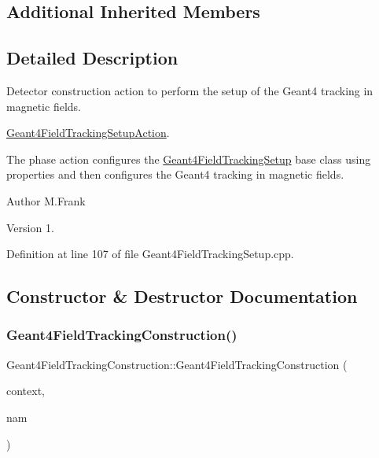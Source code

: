 \subsection*{Additional Inherited Members}


\subsection{Detailed Description}
Detector construction action to perform the setup of the Geant4 tracking in magnetic fields. 

\hyperlink{class_d_d4hep_1_1_simulation_1_1_geant4_field_tracking_setup_action}{Geant4\+Field\+Tracking\+Setup\+Action}.

The phase action configures the \hyperlink{struct_d_d4hep_1_1_simulation_1_1_geant4_field_tracking_setup}{Geant4\+Field\+Tracking\+Setup} base class using properties and then configures the Geant4 tracking in magnetic fields.

\begin{DoxyAuthor}{Author}
M.\+Frank 
\end{DoxyAuthor}
\begin{DoxyVersion}{Version}
1. 
\end{DoxyVersion}


Definition at line 107 of file Geant4\+Field\+Tracking\+Setup.\+cpp.



\subsection{Constructor \& Destructor Documentation}
\hypertarget{class_d_d4hep_1_1_simulation_1_1_geant4_field_tracking_construction_a30d46b332f2f91ec1f9923bc097812b3}{}\label{class_d_d4hep_1_1_simulation_1_1_geant4_field_tracking_construction_a30d46b332f2f91ec1f9923bc097812b3} 
\subsubsection{\texorpdfstring{Geant4\+Field\+Tracking\+Construction()}{Geant4FieldTrackingConstruction()}}
{\footnotesize\ttfamily Geant4\+Field\+Tracking\+Construction\+::\+Geant4\+Field\+Tracking\+Construction (\begin{DoxyParamCaption}\item[{\hyperlink{class_d_d4hep_1_1_simulation_1_1_geant4_context}{Geant4\+Context} $\ast$}]{context,  }\item[{const std\+::string \&}]{nam }\end{DoxyParamCaption})}



